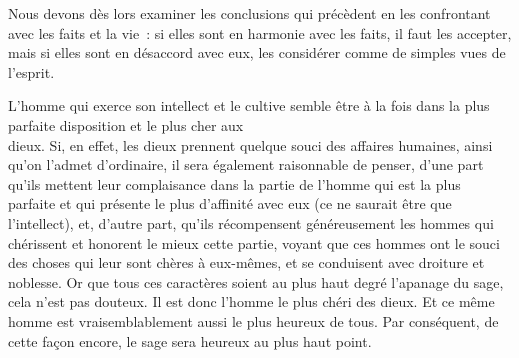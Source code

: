 \documentclass[french,twoside]{book} %
\begin{document}
Nous devons dès lors examiner les conclusions qui précèdent en les confrontant avec les faits et la vie : si elles sont en harmonie avec les faits, il faut les accepter, mais si elles sont en désaccord avec eux, les considérer comme de simples vues de l’esprit.\par
L’homme qui exerce son intellect et le cultive semble être à la fois dans la plus parfaite disposition et le plus cher aux \\
dieux. Si, en effet, les dieux prennent quelque souci des affaires humaines, ainsi qu’on l’admet d’ordinaire, il sera également raisonnable de penser, d’une part qu’ils mettent leur complaisance dans la partie de l’homme qui est la plus parfaite et qui présente le plus d’affinité avec eux (ce ne saurait être que l’intellect), et, d’autre part, qu’ils récompensent généreusement les hommes qui chérissent et honorent le mieux cette partie, voyant que ces hommes ont le souci des choses qui leur sont chères à eux-mêmes, et se conduisent avec droiture et \\
noblesse. Or que tous ces caractères soient au plus haut degré l’apanage du sage, cela n’est pas douteux. Il est donc l’homme le plus chéri des dieux. Et ce même homme est vraisemblablement aussi le plus heureux de tous. Par conséquent, de cette façon encore, le sage sera heureux au plus haut point.
\end{document}
